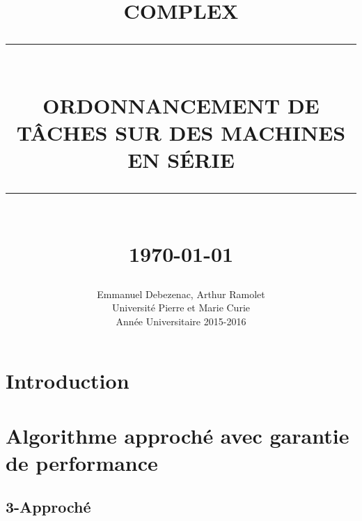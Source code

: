 \documentclass[12pt]{article}
\newcommand{\HRule}[1]{\rule{\linewidth}{#1}}
\begin{document}
\title{ \normalsize \textsc{COMPLEX}
		\\ [2.0cm]
		\HRule{0.5pt} \\
		\LARGE \textbf{\uppercase{Ordonnancement de tâches sur des machines en série}}
		\HRule{2pt} \\ [0.5cm]
		\normalsize \today \vspace*{5\baselineskip}}

\date{}

\author{
		Emmanuel Debezenac, Arthur Ramolet \\ 
		Université Pierre et Marie Curie \\
		Année Universitaire 2015-2016 }

\maketitle

\newpage
\tableofcontents

\newpage
\sectionfont{\scshape}


\clearpage
\newpage
\section{Introduction}



\clearpage
\newpage
\section{Algorithme approché avec garantie de performance}



\subsection{3-Approché}
\end{document}
